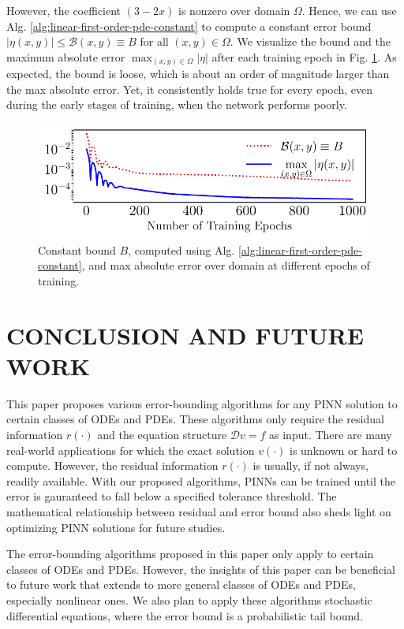 \documentclass[accepted]{uai2023}
\newcommand{\Err}{\eta}
\newcommand{\Bound}{\mathcal{B}}
\begin{document}
    However, the coefficient $(3-2x)$ is nonzero over domain $\Omega$.
    Hence, we can use Alg. \ref{alg:linear-first-order-pde-constant} to compute a constant error bound $|\eta(x, y)| \leq \Bound(x, y) \equiv B$ for all $(x, y) \in \Omega$.
    We visualize the bound and the maximum absolute error $\max_{(x, y)\in\Omega}|\Err|$ after each training epoch in Fig. \ref{fig:pde-constant-bound}.
    As expected, the bound is loose, which is about an order of magnitude larger than the max absolute error.
    Yet, it consistently holds true for every epoch, even during the early stages of training, when the network performs poorly.
    \begin{figure}[!ht]
        \centering
        \includegraphics[width=\linewidth]{assets/pde-constant-bound.pdf}
        \caption{
            \small
            Constant bound $B$, computed using Alg. \ref{alg:linear-first-order-pde-constant}, and max absolute error over domain at different epochs of training.
        }\label{fig:pde-constant-bound}
    \end{figure}

\section{CONCLUSION AND FUTURE WORK}
    This paper proposes various error-bounding algorithms for any PINN solution to certain classes of ODEs and PDEs. 
    These algorithms only require the residual information $r(\cdot)$ and the equation structure $\mathcal{D} v = f$ as input.
    There are many real-world applications for which the exact solution $v(\cdot)$ is unknown or hard to compute.
    However, the residual information $r(\cdot)$ is usually, if not always, readily available.
    With our proposed algorithms, PINNs can be trained until the error is gauranteed to fall below a specified tolerance threshold.
    The mathematical relationship between residual and error bound also sheds light on optimizing PINN solutions for future studies.

    The error-bounding algorithms proposed in this paper only apply to certain classes of ODEs and PDEs.
    However, the insights of this paper can be beneficial to future work that extends to more general classes of ODEs and PDEs, especially nonlinear ones.
    We also plan to apply these algorithms stochastic differential equations, where the error bound is a probabilistic tail bound.
    

\end{document}
